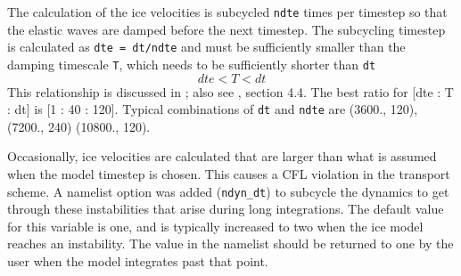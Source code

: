 The calculation of the ice velocities is subcycled {\tt ndte} times per
timestep so that the elastic waves are damped before the next timestep. The
subcycling timestep is calculated as {\tt dte = dt/ndte}
and must be sufficiently smaller than the damping timescale {\tt T},
which needs to be sufficiently shorter than {\tt dt}
\begin{equation}
 dte < T < dt
\end{equation}
This relationship is discussed in \cite{hunk01}; also
see \cite{cice02}, section 4.4.  The best ratio for
[dte : T : dt] is [1 : 40 : 120]. Typical combinations of {\tt dt}
and {\tt ndte} are (3600., 120), (7200., 240) (10800., 120).

Occasionally, ice velocities are calculated that are larger than what is
assumed when the model timestep is chosen.  This causes a CFL violation
in the transport scheme.  A namelist option was added ({\tt ndyn\_dt})
to subcycle the dynamics to get through these instabilities that arise
during long integrations.  The default value for this variable is one,
and is typically increased to two when the ice model reaches an instability.
The value in the namelist should be returned to one by the user when the
model integrates past that point.

